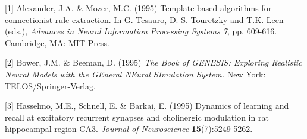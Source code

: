 \documentclass{article} %
\begin{document}
\small{
[1] Alexander, J.A. \& Mozer, M.C. (1995) Template-based algorithms
for connectionist rule extraction. In G. Tesauro, D. S. Touretzky
and T.K. Leen (eds.), {\it Advances in Neural Information Processing
Systems 7}, pp. 609-616. Cambridge, MA: MIT Press.

[2] Bower, J.M. \& Beeman, D. (1995) {\it The Book of GENESIS: Exploring
Realistic Neural Models with the GEneral NEural SImulation System.}
New York: TELOS/Springer-Verlag.

[3] Hasselmo, M.E., Schnell, E. \& Barkai, E. (1995) Dynamics of learning
and recall at excitatory recurrent synapses and cholinergic modulation
in rat hippocampal region CA3. {\it Journal of Neuroscience}
{\bf 15}(7):5249-5262.
}
\end{document}
